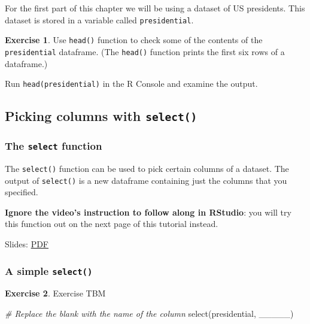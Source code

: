 \documentclass[
]{article}
\newenvironment{Shaded}{\begin{snugshade}}{\end{snugshade}}
\newcommand{\CommentTok}[1]{\textcolor[rgb]{0.56,0.35,0.01}{\textit{#1}}}
\newcommand{\FunctionTok}[1]{\textcolor[rgb]{0.00,0.00,0.00}{#1}}
\newcommand{\NormalTok}[1]{#1}
\theoremstyle{definition}
\theoremstyle{definition}
\theoremstyle{definition}
\newtheorem{exercise}{Exercise}[section]
\theoremstyle{definition}
\theoremstyle{remark}
\begin{document}
For the first part of this chapter we will be using a dataset of US presidents. This dataset is stored in a variable called \texttt{presidential}.

\begin{exercise}
Use \texttt{head()} function to check some of the contents of the \texttt{presidential} dataframe. (The \texttt{head()} function prints the first six rows of a dataframe.)

Run \texttt{head(presidential)} in the R Console and examine the output.
\end{exercise}

\hypertarget{picking-columns-with-select}{%
\subsection{\texorpdfstring{Picking columns with \texttt{select()}}{Picking columns with select()}}\label{picking-columns-with-select}}

\hypertarget{the-select-function}{%
\subsubsection{\texorpdfstring{The \texttt{select} function}{The select function}}\label{the-select-function}}

The \texttt{select()} function can be used to pick certain columns of a dataset. The output of \texttt{select()} is a new dataframe containing just the columns that you specified.

\textbf{Ignore the video's instruction to follow along in RStudio}: you will try this function out on the next page of this tutorial instead.

Slides: \href{https://drive.google.com/file/d/1DtuT-rtWs-i6MzWiYtX4HUvlqpIlZfUm}{PDF}

\hypertarget{a-simple-select}{%
\subsubsection{\texorpdfstring{A simple \texttt{select()}}{A simple select()}}\label{a-simple-select}}

\begin{exercise}
Exercise TBM
\end{exercise}

\begin{Shaded}
\begin{Highlighting}[]
\CommentTok{\# Replace the blank with the name of the column}
\FunctionTok{select}\NormalTok{(presidential, \_\_\_\_\_)}
\end{Highlighting}
\end{Shaded}
\end{document}
